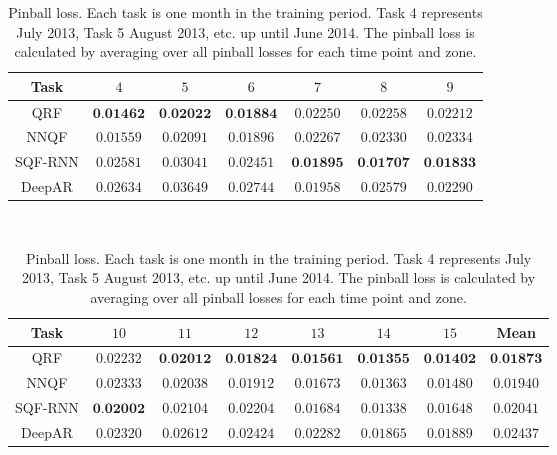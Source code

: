 \begin{table}[ht]%
    \footnotesize
    \hspace*{25pt} %
    \begin{minipage}{\textwidth}
    \renewcommand{\b}[1]{\textbf{#1}}
    \begin{tabular}{c|cccccc}
        \toprule \noalign{\smallskip}
        Task & \(4\) & \(5\) & \(6\) & \(7\) & \(8\) & \(9\) \\
        \midrule
        QRF     & \(\b{0.01462}\) & \(\b{0.02022}\) & \(\b{0.01884}\) & \(0.02250\)     & \(0.02258\)     & \(0.02212\)     \\
        NNQF    & \(0.01559\)     & \(0.02091\)     & \(0.01896\)     & \(0.02267\)     & \(0.02330\)     & \(0.02334\)     \\
        SQF-RNN & \(0.02581\)     & \(0.03041\)     & \(0.02451\)     & \(\b{0.01895}\) & \(\b{0.01707}\) & \(\b{0.01833}\) \\
        DeepAR  & \(0.02634\)     & \(0.03649\)     & \(0.02744\)     & \(0.01958\)     & \(0.02579\)     & \(0.02290\)     \\
        \bottomrule
    \end{tabular}
    \vspace*{1em} \\
    \begin{tabular}{c|cccccc|c}
        \toprule \noalign{\smallskip}
        Task & \(10\) & \(11\) & \(12\) & \(13\) & \(14\) & \(15\) & Mean \\
        \midrule
        QRF     & \(0.02232\)     & \(\b{0.02012}\) & \(\b{0.01824}\) & \(\b{0.01561}\) & \(\b{0.01355}\) & \(\b{0.01402}\) & \(\b{0.01873}\) \\
        NNQF    & \(0.02333\)     & \(0.02038\)     & \(0.01912\)     & \(0.01673\)     & \(0.01363\)     & \(0.01480\)     & \(0.01940\)     \\
        SQF-RNN & \(\b{0.02002}\) & \(0.02104\)     & \(0.02204\)     & \(0.01684\)     & \(0.01338\)     & \(0.01648\)     & \(0.02041\)     \\
        DeepAR  & \(0.02320\)     & \(0.02612\)     & \(0.02424\)     & \(0.02282\)     & \(0.01865\)     & \(0.01889\)     & \(0.02437\)     \\
        \bottomrule
    \end{tabular}
    \end{minipage}

    \caption[Pinball loss]{Pinball loss. 
    Each task is one month in the training period. 
    Task 4 represents July 2013, Task 5 August 2013, etc. up until June 2014.
    The pinball loss is calculated by averaging 
    over all pinball losses for each time point and zone.}
    \label{table:pinball-loss}
\end{table}

